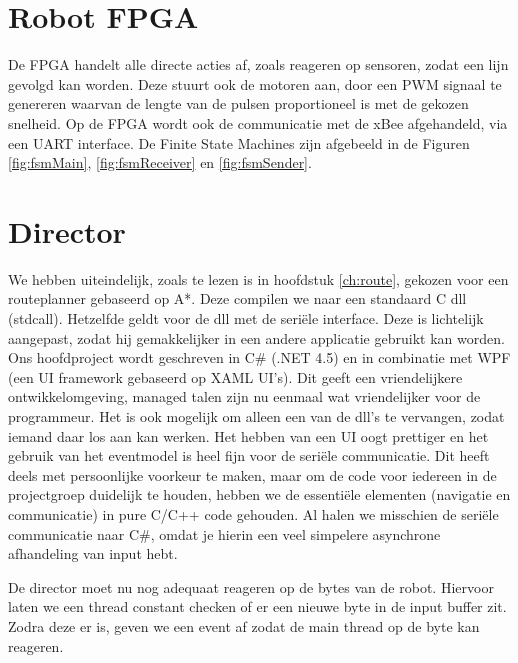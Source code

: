 \documentclass{report}
\begin{document}
\section{Robot FPGA}
De FPGA handelt alle directe acties af, zoals reageren op sensoren, zodat een lijn gevolgd kan worden.
Deze stuurt ook de motoren aan, door een PWM signaal te genereren waarvan de lengte van de pulsen proportioneel is met de gekozen snelheid.
Op de FPGA wordt ook de communicatie met de xBee afgehandeld, via een UART interface.
De Finite State Machines zijn afgebeeld in de Figuren \ref{fig:fsmMain}, \ref{fig:fsmReceiver} en \ref{fig:fsmSender}.

\section{Director}
We hebben uiteindelijk, zoals te lezen is in hoofdstuk \ref{ch:route}, gekozen voor een routeplanner gebaseerd op A*. Deze compilen we naar een standaard C dll (stdcall).
Hetzelfde geldt voor de dll met de seriële interface. Deze is lichtelijk aangepast, zodat hij gemakkelijker in een andere applicatie gebruikt kan worden.
Ons hoofdproject wordt geschreven in C\# (.NET 4.5) en in combinatie met WPF (een UI framework gebaseerd op XAML UI's).
Dit geeft een vriendelijkere ontwikkelomgeving, managed talen zijn nu eenmaal wat vriendelijker voor de programmeur.
Het is ook mogelijk om alleen een van de dll's te vervangen, zodat iemand daar los aan kan werken.
Het hebben van een UI oogt prettiger en het gebruik van het eventmodel is heel fijn voor de seriële communicatie.
Dit heeft deels met persoonlijke voorkeur te maken, maar om de code voor iedereen in de projectgroep duidelijk te houden, hebben we de essentiële elementen (navigatie en communicatie) in pure C/C++ code gehouden. Al halen we misschien de seriële communicatie naar C\#, omdat je hierin een veel simpelere asynchrone afhandeling van input hebt.

De director moet nu nog adequaat reageren op de bytes van de robot.
Hiervoor laten we een thread constant checken of er een nieuwe byte in de input buffer zit. Zodra deze er is, geven we een event af zodat de main thread op de byte kan reageren.
\end{document}
